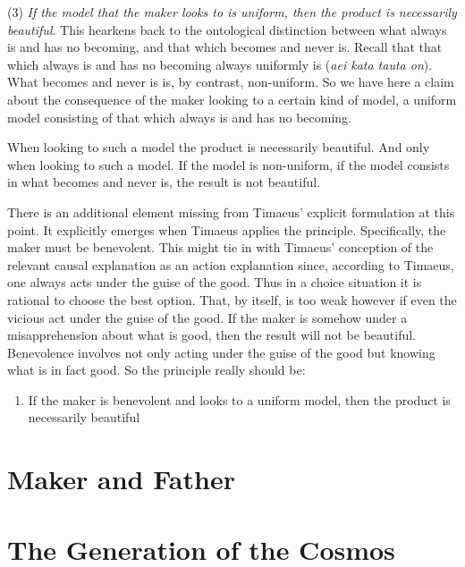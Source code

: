 (3) \emph{If the model that the maker looks to is uniform, then the product is necessarily beautiful}. This hearkens back to the ontological distinction between what always is and has no becoming, and that which becomes and never is. Recall that that which always is and has no becoming always uniformly is (\emph{aei kata tauta on}). What becomes and never is is, by contrast, non-uniform. So we have here a claim about the consequence of the maker looking to a certain kind of model, a uniform model consisting of that which always is and has no becoming. 

When looking to such a model the product is necessarily beautiful. And only when looking to such a model. If the model is non-uniform, if the model consists in what becomes and never is, the result is not beautiful. 

There is an additional element missing from Timaeus' explicit formulation at this point. It explicitly emerges when Timaeus applies the principle. Specifically, the maker must be benevolent. This might tie in with Timaeus' conception of the relevant causal explanation as an action explanation since, according to Timaeus, one always acts under the guise of the good. Thus in a choice situation it is rational to choose the best option. That, by itself, is too weak however if even the vicious act under the guise of the good. If the maker is somehow under a misapprehension about what is good, then the result will not be beautiful. Benevolence involves not only acting under the guise of the good but knowing what is in fact good. So the principle really should be:
\begin{enumerate}[(3*)]
	\item If the maker is benevolent and looks to a uniform model, then the product is necessarily beautiful
\end{enumerate}


\section{Maker and Father} %
\label{sec:maker_and_father}




\section{The Generation of the Cosmos} %
\label{sec:the_generation_of_the_cosmos}

